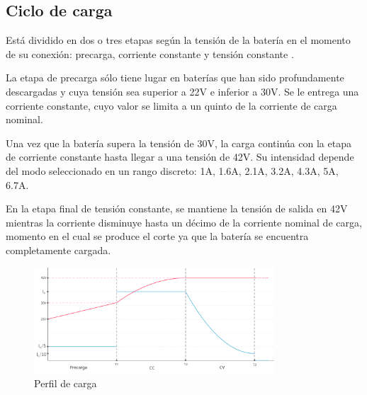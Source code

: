 \subsection{Ciclo de carga}

Está dividido en dos o tres etapas según la tensión de la batería en el momento de su conexión: precarga, corriente constante y tensión constante \cite{icr18650s3}\cite{ncr18650ga}.

La etapa de precarga sólo tiene lugar en baterías que han sido profundamente descargadas y cuya tensión sea superior a 22V e inferior a 30V.
Se le entrega una corriente constante, cuyo valor se limita a un quinto de la corriente de carga nominal.

Una vez que la batería supera la tensión de 30V, la carga continúa con la etapa de corriente constante hasta llegar a una tensión de 42V.
Su intensidad depende del modo seleccionado en un rango discreto: 1A, 1.6A, 2.1A, 3.2A, 4.3A, 5A, 6.7A.

En la etapa final de tensión constante, se mantiene la tensión de salida en 42V mientras la corriente disminuye hasta un décimo de la corriente nominal de carga,
momento en el cual se produce el corte ya que la batería se encuentra completamente cargada. 

\begin{figure}[H]
    \centering
    \includegraphics[width=0.8\textwidth]{images/perfil_de_carga.png}
    \caption{Perfil de carga}
    \label{fig:perfil_de_carga}
\end{figure}
